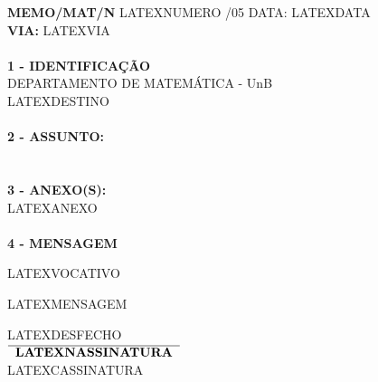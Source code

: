 \documentclass[12pt]{artigo}
\begin{document}
\vspace*{.8cm}
\timbrado
\parindent=2cm 
\setlength{\baselineskip}{5mm}
\noindent 
\begin{minipage}{16cm}
\vspace*{-12mm}
\parindent=2cm
\setlength{\baselineskip}{5mm}
\vspace*{.2cm}
\noindent
\small
{\bf  MEMO/MAT/N\primo} LATEXNUMERO /05 \hfill {DATA:} {LATEXDATA}
\vum \\
{\bf VIA:} {LATEXVIA}  
\\
\mbox{} \hrulefill\
\\
{\bf 1 - IDENTIFICA\c{C}\~AO} 
\\
\phantom{xxx}{\bf Proced\^encia:} {DEPARTAMENTO DE MATEM\'ATICA - UnB}
\\
 {LATEXDESTINO}
\\
\mbox{} \hrulefill\
\\
{\bf 2 - ASSUNTO:} \\
\phantom{xxx}{LATEXASSUNTO}
\\
\mbox{} \hrulefill\
\\
{\bf 3 - ANEXO(S):} 
\\
\phantom{xxx} {LATEXANEXO}
\\
\mbox{} \hrulefill\
\\
{ \bf 4 - MENSAGEM} 
\end{minipage}
\setlength{\baselineskip}{9mm}
\vspace*{.92cm} 

LATEXVOCATIVO %
\vspace*{8mm} 

LATEXMENSAGEM
\vspace*{15mm} 
\begin{center} 
\setlength{\baselineskip}{6mm}
LATEXDESFECHO %
\vspace*{15mm} \\
$\overline{\phantom{x}\mbox{\bf LATEXNASSINATURA} \phantom{x}}$ 
\\
LATEXCASSINATURA
\end{center}
\end{document}
